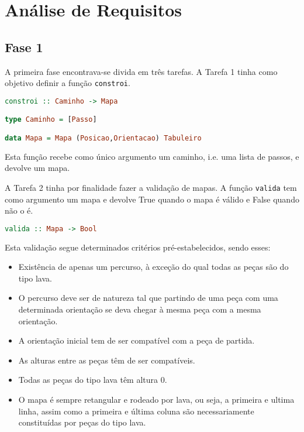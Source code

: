 \chapter{Análise de Requisitos}


\section{Fase 1}
\label{sec:analisefase1}

A primeira fase encontrava-se divida em três tarefas. A Tarefa 1 tinha como
objetivo definir a função \texttt{constroi}.

\begin{lstlisting}[language=Haskell]
constroi :: Caminho -> Mapa

type Caminho = [Passo]

data Mapa = Mapa (Posicao,Orientacao) Tabuleiro
\end{lstlisting}

Esta função recebe como único argumento um caminho, i.e. uma lista de passos, e
devolve um mapa.

A Tarefa 2 tinha por finalidade fazer a validação de mapas. A função
\texttt{valida} tem como argumento um mapa e devolve True quando o mapa é válido
e False quando não o é.

\begin{lstlisting}[language=Haskell]
 valida :: Mapa -> Bool
\end{lstlisting}

Esta validação segue determinados critérios pré-estabelecidos, sendo esses:

\begin{itemize}
\item
  Existência de apenas um percurso, à exceção do qual todas as peças são
  do tipo lava.
\item
  O percurso deve ser de natureza tal que partindo de uma peça com uma
  determinada orientação se deva chegar à mesma peça com a mesma orientação.
\item
  A orientação inicial tem de ser compatível com a peça de partida.
\item
  As alturas entre as peças têm de ser compatíveis.
\item
  Todas as peças do tipo lava têm altura 0.
\item
  O mapa é sempre retangular e rodeado por lava, ou seja, a primeira e
  ultima linha, assim como a primeira e última coluna são
  necessariamente constituídas por peças do tipo lava.
\end{itemize}

